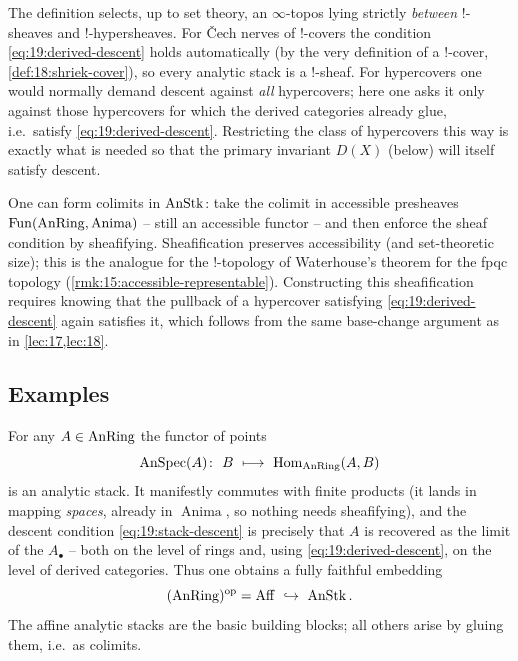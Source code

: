 \begin{remark}
\label{rmk:19:intermediate-topos}
The definition selects, up to set theory, an $\infty$-topos lying strictly
\emph{between} $!$-sheaves and $!$-hypersheaves. For \v Cech nerves of
$!$-covers the condition \eqref{eq:19:derived-descent} holds automatically (by
the very definition of a $!$-cover, \cref{def:18:shriek-cover}), so every
analytic stack is a $!$-sheaf. For hypercovers one would normally demand descent
against \emph{all} hypercovers; here one asks it only against those hypercovers
for which the derived categories already glue, i.e.\ satisfy
\eqref{eq:19:derived-descent}. Restricting the class of hypercovers this way is
exactly what is needed so that the primary invariant $D(X)$ (below) will itself
satisfy descent.
\end{remark}

\begin{remark}
\label{rmk:19:sheafification}
One can form colimits in $\operatorname{AnStk}$: take the colimit in accessible presheaves
$\operatorname{Fun}(\operatorname{AnRing},\operatorname{Anima})$ -- still an accessible functor
-- and then enforce the sheaf condition by sheafifying. Sheafification preserves
accessibility (and set-theoretic size); this is the analogue for the
$!$-topology of Waterhouse's theorem \cite{Waterhouse_1975} for the fpqc
topology (\cref{rmk:15:accessible-representable}). Constructing this
sheafification requires knowing that the pullback of a hypercover satisfying
\eqref{eq:19:derived-descent} again satisfies it, which follows from the same
base-change argument as in \cref{lec:17,lec:18}.
\end{remark}

\subsection{Examples}
\label{subsec:19:examples}

\begin{example}
\label{ex:19:affine}
For any $A\in\operatorname{AnRing}$ the functor of points
\begin{equation*}
\AnSpec(A)\colon\ B\ \longmapsto\ \Homop_{\AnRing}(A,B)
\end{equation*}
is an analytic stack. It manifestly commutes with finite products (it lands in
mapping \emph{spaces}, already in $\operatorname{Anima}$, so nothing needs
sheafifying), and the descent condition \eqref{eq:19:stack-descent} is precisely
that $A$ is recovered as the limit of the $A_\bullet$ -- both on the level of
rings and, using \eqref{eq:19:derived-descent}, on the level of derived
categories. Thus one obtains a fully faithful embedding
\begin{equation}
\label{eq:19:anring-embed}
(\operatorname{AnRing})^{\mathrm{op}}=\operatorname{Aff}\ \hookrightarrow\ \operatorname{AnStk} .
\end{equation}
The affine analytic stacks are the basic building blocks; all others arise by
gluing them, i.e.\ as colimits.
\end{example}

